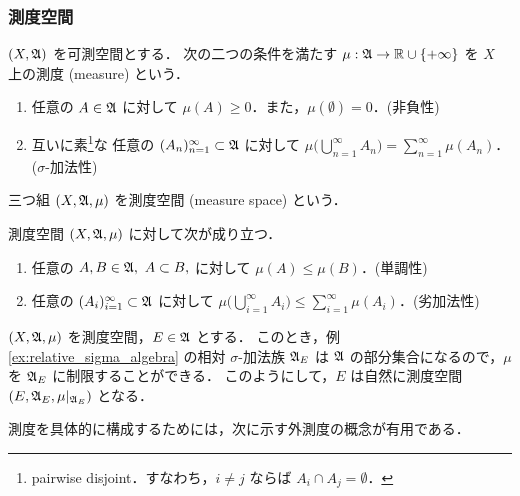 \subsubsection{測度空間}

\begin{definition}
    $(X,\mathfrak{A})$ を可測空間とする．
    次の二つの条件を満たす $\mu:\mathfrak{A}\to\mathbb{R}\cup\{+\infty\}$ を $X$ 上の測度 (measure) という．
    \begin{enumerate}[label=\textsf{(M\arabic*)},align=left]
        \item\label{item:m1} 任意の $A\in\mathfrak{A}$ に対して $\mu(A)\ge0$．また，$\mu(\emptyset)=0$．\qquad (非負性)
        \item\label{item:m2} 互いに素\footnote{pairwise disjoint．すなわち，$i\ne j$ ならば $A_i\cap A_j=\emptyset$．}な
            任意の $(A_n)_{n=1}^\infty\subset\mathfrak{A}$ に対して
            $\displaystyle\mu\biggl(\bigcup_{n=1}^\infty A_n\biggr)=\sum_{n=1}^\infty\mu(A_n)$．\qquad ($\sigma$-加法性)
    \end{enumerate}
    三つ組 $(X,\mathfrak{A},\mu)$ を測度空間 (measure space) という．
\end{definition}

\begin{remark}\label{rem:measure_property}
    測度空間 $(X,\mathfrak{A},\mu)$ に対して次が成り立つ．
    \begin{enumerate}
        \item 任意の $A,B\in\mathfrak{A},\ A\subset B,$ に対して $\mu(A)\le\mu(B)$．\qquad(単調性)
        \item 任意の $(A_i)_{i=1}^\infty\subset\mathfrak{A}$ に対して $\displaystyle\mu\biggl(\bigcup_{i=1}^\infty A_i\biggr)\le\sum_{i=1}^\infty\mu(A_i)$．\qquad(劣加法性)
    \end{enumerate}
\end{remark}

\begin{example}\label{ex:restriction_of_measure}
    $(X,\mathfrak{A},\mu)$ を測度空間，$E\in\mathfrak{A}$ とする．
    このとき，例 \ref{ex:relative_sigma_algebra} の相対 $\sigma$-加法族 $\mathfrak{A}_E$ は
    $\mathfrak{A}$ の部分集合になるので，$\mu$ を $\mathfrak{A}_E$ に制限することができる．
    このようにして，$E$ は自然に測度空間 $(E,\mathfrak{A}_E,\mu\vert_{\mathfrak{A}_E})$ となる．
\end{example}

測度を具体的に構成するためには，次に示す外測度の概念が有用である．

